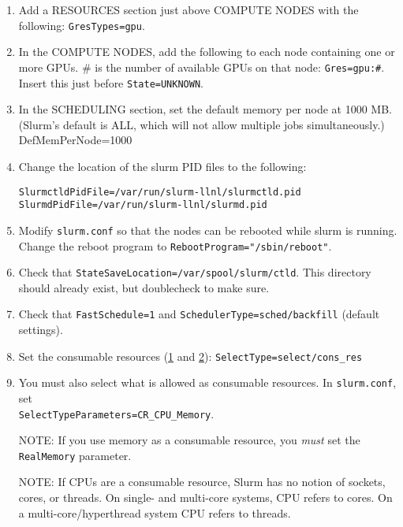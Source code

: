 \begin{enumerate}
\begin{enumerate}
\begin{enumerate}
		\item Add a RESOURCES section just above COMPUTE NODES with the following: \texttt{GresTypes=gpu}.

		\item In the COMPUTE NODES, add the following to each node containing one or more GPUs. \# is the number of available GPUs on that node: \texttt{Gres=gpu:\#}. Insert this just before \texttt{State=UNKNOWN}.

		\item In the SCHEDULING section, set the default memory per node at 1000 MB. (Slurm's default is ALL, which will not allow multiple jobs simultaneously.) \\
		DefMemPerNode=1000

		\item Change the location of the slurm PID files to the following:

		\texttt{SlurmctldPidFile=/var/run/slurm-llnl/slurmctld.pid} \\ %
		\texttt{SlurmdPidFile=/var/run/slurm-llnl/slurmd.pid} %

		\item Modify \texttt{slurm.conf} so that the nodes can be rebooted while slurm is running. Change the reboot program to \texttt{RebootProgram="/sbin/reboot"}. 
		
		\item Check that \texttt{StateSaveLocation=/var/spool/slurm/ctld}. This directory should already exist, but doublecheck to make sure.

		\item Check that \texttt{FastSchedule=1} and \texttt{SchedulerType=sched/backfill} (default settings).
	
		\item Set the consumable resources (\href{https://slurm.schedmd.com/cons_res.html}{1} and \href{https://slurm.schedmd.com/cons_res_share.html}{2}):
		\texttt{SelectType=select/cons\_res}
	
		\item You must also select what is allowed as consumable resources. In \texttt{slurm.conf}, set \\
		\texttt{SelectTypeParameters=CR\_CPU\_Memory}. 
	
		NOTE: If you use memory as a consumable resource, you \emph{must} set the \texttt{RealMemory} parameter.
	
		NOTE: If CPUs are a consumable resource, Slurm has no notion of sockets, cores, or threads. On single- and multi-core systems, CPU refers to cores. On a multi-core/hyperthread system CPU refers to threads.
	

\end{enumerate}
\end{enumerate}
\end{enumerate}
